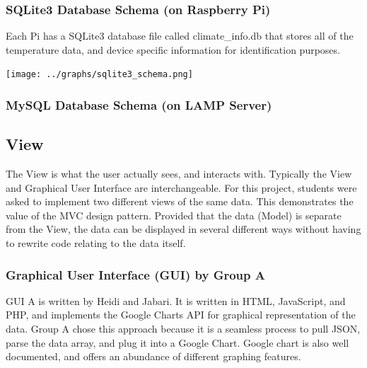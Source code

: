 \documentclass{article}
\begin{document}
			\subsubsection{SQLite3 Database Schema (on Raspberry Pi)}	
				Each Pi has a SQLite3 database file called climate\_info.db that stores all of the temperature data, and device specific information
				for identification purposes.
				
				\begin{center}
					\texttt{[image: ../graphs/sqlite3\_schema.png]}
				\end{center}
			
			\subsubsection{MySQL Database Schema (on LAMP Server)}
			
		\subsection{View}
			The View is what the user actually sees, and interacts with. Typically the View and Graphical User Interface are interchangeable.
			For this project, students were asked to implement two different views of the same data. This demonstrates the value of
			the MVC design pattern. Provided that the data (Model) is separate from the View, the data can be displayed in several different
			ways without having to rewrite code relating to the data itself.		
		
			\subsubsection{Graphical User Interface (GUI) by Group A}
				GUI A is written by Heidi and Jabari. It is written in HTML, JavaScript, and PHP, and implements the Google Charts API
				for graphical representation of the data. Group A chose this approach because it is a seamless process to pull JSON, parse the data 
				array, and plug it into a Google Chart. Google chart is also well documented, and offers an abundance of different graphing features.
				
\end{document}
